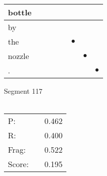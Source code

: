 \documentclass[landscape]{article}
\newcommand{\ssp}{\hspace{2pt}}
\newcommand{\mex}{\cellcolor{g}$\bullet$}
\begin{document}
\begin{tabular}{|l|p{10pt}|p{10pt}|p{10pt}|p{10pt}|p{10pt}|p{10pt}|p{10pt}|}
\hline
\ssp bottle \ssp&\hspace{2pt}&\hspace{2pt}&\hspace{2pt}&\hspace{2pt}&\hspace{2pt}&\hspace{2pt}&\hspace{2pt}\\
\hline
\ssp by \ssp&\hspace{2pt}&\hspace{2pt}&\hspace{2pt}&\hspace{2pt}&\hspace{2pt}&\hspace{2pt}&\hspace{2pt}\\
\hline
\ssp \cellcolor{ref4}the \ssp&\hspace{2pt}&\hspace{2pt}&\hspace{2pt}&\hspace{2pt}&\hspace{2pt}\mex&\hspace{2pt}&\hspace{2pt}\\
\hline
\ssp \cellcolor{ref5}nozzle \ssp&\hspace{2pt}&\hspace{2pt}&\hspace{2pt}&\hspace{2pt}&\hspace{2pt}&\hspace{2pt}\mex&\hspace{2pt}\\
\hline
\ssp \cellcolor{ref6}. \ssp&\hspace{2pt}&\hspace{2pt}&\hspace{2pt}&\hspace{2pt}&\hspace{2pt}&\hspace{2pt}&\hspace{2pt}\mex\\
\hline
\end{tabular}

\vspace{6pt}
\noindent Segment 117\\\\
\noindent\begin{tabular}{lm{12pt}r}
\hline
P:&&0.462\\
R:&&0.400\\
Frag:&&0.522\\
Score:&&0.195\\
\end{tabular}
\end{document}
